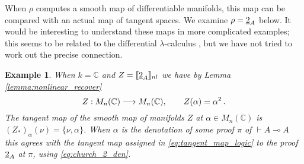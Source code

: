 \documentclass[english,letter paper,12pt,reqno]{article}
\theoremstyle{example}
\newtheorem{example}[theorem]{Example}
\begin{document}
When $\rho$ computes a smooth map of differentiable manifolds, this map can be compared with an actual map of tangent spaces. We examine $\rho = \underline{2}_A$ below. It would be interesting to understand these maps in more complicated examples; this seems to be related to the differential $\lambda$-calculus \cite{ehrhard_difflambda,ehrhard_difflambda2}, but we have not tried to work out the precise connection.

\begin{example}\label{example:tangent_to_2} When $k = \mathbb{C}$ and $Z = \llbracket \underline{2}_A \rrbracket_{nl}$ we have by Lemma \ref{lemma:nonlinear_recover}
\[
Z: M_n(\mathbb{C}) \longrightarrow M_n(\mathbb{C}), \qquad Z(\alpha) = \alpha^2\,.
\]
The tangent map of the smooth map of manifolds $Z$ at $\alpha \in M_n(\mathbb{C})$ is $(Z_*)_\alpha( \nu ) = \{ \nu, \alpha \}$. When $\alpha$ is the denotation of some proof $\pi$ of $\vdash A \multimap A$ this agrees with the tangent map assigned in \eqref{eq:tangent_map_logic} to the proof $\underline{2}_A$ at $\pi$, using \eqref{eq:church_2_den}.
\end{example}
\end{document}
